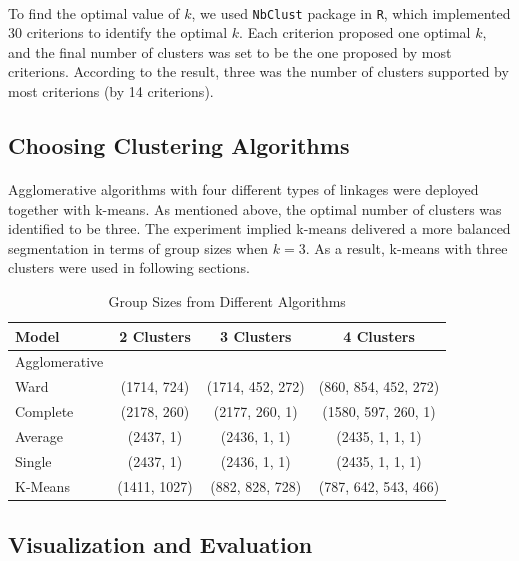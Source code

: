 \documentclass[11pt]{article}
\begin{document}
	\paragraph{} To find the optimal value of $k$, we used \texttt{NbClust} package in \texttt{R}, which implemented 30 criterions to identify the optimal $k$. Each criterion proposed one optimal $k$, and the final number of clusters was set to be the one proposed by most criterions. According to the result, three was the number of clusters supported by most criterions (by 14 criterions).

	\subsection{Choosing Clustering Algorithms}
	\paragraph{} Agglomerative algorithms with four different types of linkages were deployed together with k-means. As mentioned above, the optimal number of clusters was identified to be three. The experiment implied k-means delivered a more balanced segmentation in terms of group sizes when $k=3$. As a result, k-means with three clusters were used in following sections.
	
	\begin{table}[H]
		\centering
		\begin{tabular}{l|c|c|c}
			Model & 2 Clusters & 3 Clusters & 4 Clusters \\
			\hline
			\hline
			Agglomerative \\
			\hline
			Ward & (1714, 724) & (1714, 452, 272) & (860, 854, 452, 272) \\
			Complete & (2178, 260) & (2177, 260, 1) & (1580, 597, 260, 1) \\
			Average & (2437, 1) & (2436, 1, 1) & (2435, 1, 1, 1) \\
			Single & (2437, 1) & (2436, 1, 1) & (2435, 1, 1, 1) \\
			\hline
			\hline
			K-Means & (1411, 1027) & (882, 828, 728) & (787, 642, 543, 466)
		\end{tabular}
		\caption{Group Sizes from Different Algorithms}
	\end{table}
	
	\subsection{Visualization and Evaluation}
\end{document}
